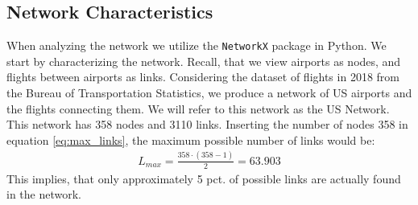 \label{sec:empirical}
\subsection{Network Characteristics}
\label{subsec:empirical_network_characteristics}
When analyzing the network we utilize the \texttt{NetworkX} package in Python. We start by characterizing the network. Recall, that we view airports as nodes, and flights between airports as links. Considering the dataset of flights in 2018 from the Bureau of Transportation Statistics, we produce a network of US airports and the flights connecting them. We will refer to this network as the US Network. This network has 358 nodes and 3110 links. Inserting the number of nodes 358 in equation \ref{eq:max_links}, the maximum possible number of links would be: 
\begin{align}
    L_{max}  = \frac{358\cdot(358-1)}{2} = 63.903
\end{align}
This implies, that only approximately 5 pct. of possible links are actually found in the network. 

